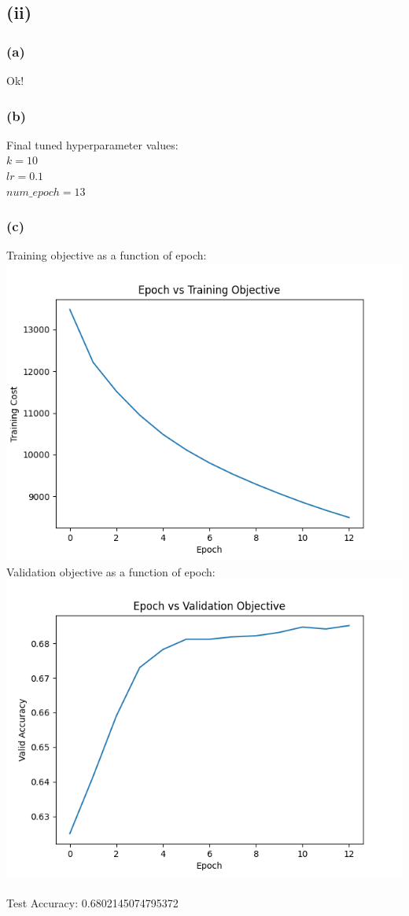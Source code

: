 \documentclass{article}
\begin{document}
\subsection{(ii)}
\subsubsection{(a)}
Ok!
\subsubsection{(b)}
Final tuned hyperparameter values:\\
$k = 10$\\
$lr = 0.1$\\
$num\_epoch = 13$
\subsubsection{(c)}
Training objective as a function of epoch:\\
\includegraphics[scale=0.6]{figures/Aq3_train_objective_plot.png}\\
Validation objective as a function of epoch:\\
\includegraphics[scale=0.6]{figures/Aq3_valid_objective_plot.png}\\
\\
Test Accuracy: 0.6802145074795372
\end{document}
